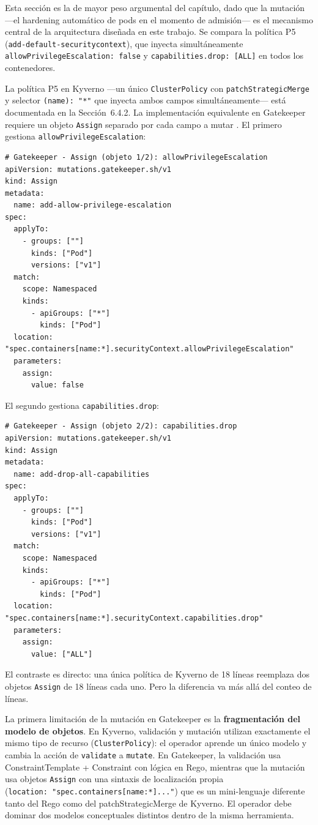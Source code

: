 Esta sección es la de mayor peso argumental del capítulo, dado que la mutación ---el hardening automático de pods en el momento de admisión--- es el mecanismo central de la arquitectura diseñada en este trabajo. Se compara la política P5 (\texttt{add-default-securitycontext}), que inyecta simultáneamente \texttt{allowPrivilegeEscalation:\,false} y \texttt{capabilities.drop:\,[ALL]} en todos los contenedores.

La política P5 en Kyverno ---un único \texttt{ClusterPolicy} con \texttt{patchStrategicMerge} y selector \texttt{(name):\,"*"} que inyecta ambos campos simultáneamente--- está documentada en la Sección~6.4.2. La implementación equivalente en Gatekeeper requiere un objeto \texttt{Assign} separado por cada campo a mutar \cite{gatekeeper_mutation}. El primero gestiona \texttt{allowPrivilegeEscalation}:

\begin{lstlisting}
# Gatekeeper - Assign (objeto 1/2): allowPrivilegeEscalation
apiVersion: mutations.gatekeeper.sh/v1
kind: Assign
metadata:
  name: add-allow-privilege-escalation
spec:
  applyTo:
    - groups: [""]
      kinds: ["Pod"]
      versions: ["v1"]
  match:
    scope: Namespaced
    kinds:
      - apiGroups: ["*"]
        kinds: ["Pod"]
  location: "spec.containers[name:*].securityContext.allowPrivilegeEscalation"
  parameters:
    assign:
      value: false
\end{lstlisting}

El segundo gestiona \texttt{capabilities.drop}:

\begin{lstlisting}
# Gatekeeper - Assign (objeto 2/2): capabilities.drop
apiVersion: mutations.gatekeeper.sh/v1
kind: Assign
metadata:
  name: add-drop-all-capabilities
spec:
  applyTo:
    - groups: [""]
      kinds: ["Pod"]
      versions: ["v1"]
  match:
    scope: Namespaced
    kinds:
      - apiGroups: ["*"]
        kinds: ["Pod"]
  location: "spec.containers[name:*].securityContext.capabilities.drop"
  parameters:
    assign:
      value: ["ALL"]
\end{lstlisting}

El contraste es directo: una única política de Kyverno de 18 líneas reemplaza dos objetos \texttt{Assign} de 18 líneas cada uno. Pero la diferencia va más allá del conteo de líneas.

La primera limitación de la mutación en Gatekeeper es la \textbf{fragmentación del modelo de objetos}. En Kyverno, validación y mutación utilizan exactamente el mismo tipo de recurso (\texttt{ClusterPolicy}): el operador aprende un único modelo y cambia la acción de \texttt{validate} a \texttt{mutate}. En Gatekeeper, la validación usa ConstraintTemplate + Constraint con lógica en Rego, mientras que la mutación usa objetos \texttt{Assign} con una sintaxis de localización propia (\texttt{location:\,"spec.containers[name:*]..."}) que es un mini-lenguaje diferente tanto del Rego como del patchStrategicMerge de Kyverno. El operador debe dominar dos modelos conceptuales distintos dentro de la misma herramienta.

